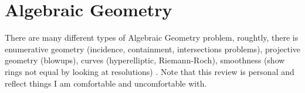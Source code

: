 \documentclass[main.tex]{subfiles}
\begin{document}
\section{Algebraic Geometry}
There are many different types of Algebraic Geometry problem, roughtly, there is enumerative geometry (incidence, containment, intersections problems), projective geometry (blowups), curves (hyperelliptic, Riemann-Roch), smoothness (show rings not equal by looking at resolutions) . Note that this review is personal and reflect things I am comfortable and uncomfortable with.
\end{document}
